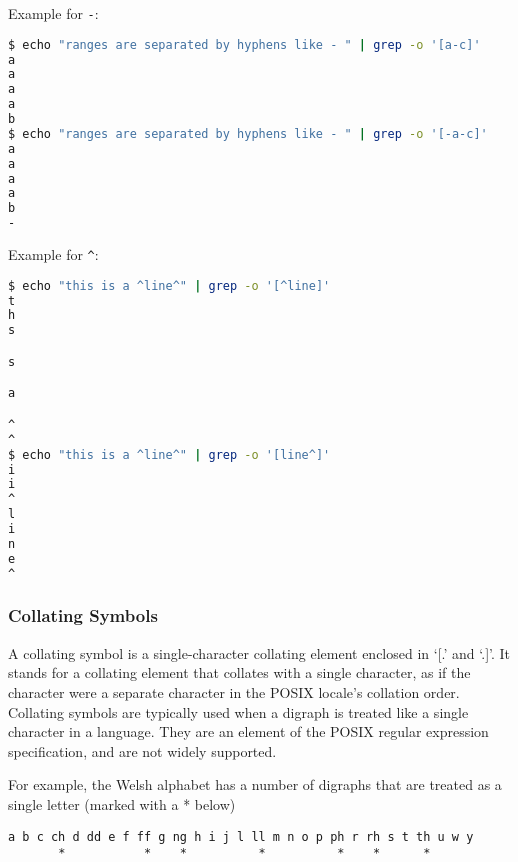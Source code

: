 Example for \lstinline|-|:
\begin{lstlisting}[language=bash]
$ echo "ranges are separated by hyphens like - " | grep -o '[a-c]'
a
a
a
a
b
$ echo "ranges are separated by hyphens like - " | grep -o '[-a-c]'
a
a
a
a
b
-
\end{lstlisting}

Example for \lstinline|^|:
\begin{lstlisting}[language=bash]
$ echo "this is a ^line^" | grep -o '[^line]'
t
h
s

s

a

^
^
$ echo "this is a ^line^" | grep -o '[line^]'
i
i
^
l
i
n
e
^
\end{lstlisting}

\subsubsection{Collating Symbols}

A collating symbol is a single-character collating element enclosed in ‘[.’ and ‘.]’. It stands for a collating element that collates with a single character, as if the character were a separate character in the POSIX locale’s collation order.
Collating symbols are typically used when a digraph is treated like a single character in a language. They are an element of the POSIX regular expression specification, and are not widely supported.

For example, the Welsh alphabet
has a number of digraphs that are treated as a single letter (marked with a * below)

\begin{lstlisting}
a b c ch d dd e f ff g ng h i j l ll m n o p ph r rh s t th u w y
       *           *    *          *          *    *      *
\end{lstlisting}

